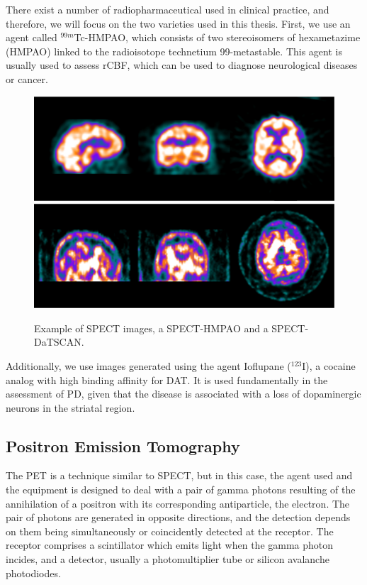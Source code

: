 There exist a number of radiopharmaceutical used in clinical practice, and therefore, we will focus on the two varieties used in this thesis. First, we use an agent called $^{99m}$Tc-HMPAO, which consists of two stereoisomers of hexametazime (HMPAO) linked to the radioisotope technetium 99-metastable. This agent is usually used to assess \ac{rCBF}, which can be used to diagnose neurological diseases or cancer. 

\begin{figure}[htp]
	\centering
	\includegraphics[width=0.7\linewidth]{Graphics/ch2/example_SPECT}\\
	\includegraphics[width=0.7\linewidth]{Graphics/ch2/example_DaTSCAN}
	\caption[Example of \acs{SPECT} images.]{Example of \ac{SPECT} images, a SPECT-HMPAO and a SPECT-DaTSCAN.}
	\label{fig:example_SPECT}
\end{figure}

Additionally, we use images generated using the agent Ioflupane ($^{123}$I), a cocaine analog with high binding affinity for \ac{DAT}. It is used fundamentally in the assessment of \ac{PD}, given that the disease is associated with a loss of dopaminergic neurons in the striatal region. 

\subsection{Positron Emission Tomography}
The \acf{PET} is a technique similar to \ac{SPECT}, but in this case, the agent used and the equipment is designed to deal with a pair of gamma photons resulting of the annihilation of a positron with its corresponding antiparticle, the electron. The pair of photons are generated in opposite directions, and the detection depends on them being simultaneously or coincidently detected at the receptor. The receptor comprises a scintillator which emits light when the gamma photon incides, and a detector, usually a photomultiplier tube or silicon avalanche photodiodes.

